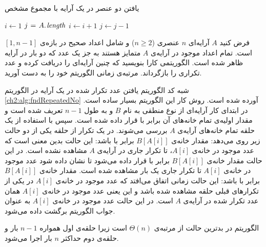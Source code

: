 \begin{algorithm}
\caption{یافتن دو عنصر در یک آرایه با مجموع مشخص}\label{ch2:alg:checkPair}
\begin{latin}
\begin{algorithmic}[1]
		\State	{}
		\State 	$i \gets 1$
		\State 	$j \mathrel{\hspace{1pt}=\hspace{1pt}} A.\hspace*{1pt}\mathit{length}$
					\State	\Return {}
					\State	$i \gets i+1$
				\Else
					\State	$j \gets j-1$
				\EndIf
		\EndWhile
		\State \Return {}\label{ch2:alg:ln:chkPairLast}
\EndFunction
\end{algorithmic}
\end{latin}
\end{algorithm}

 فرض کنید {$A$} آرایه‌ای {$n$} عنصری ({$n\geqslant 2$}) و شامل اعداد صحیح در بازه‌ی {$[1,n-1]$} است. تمام اعداد موجود در آرایه‌ی {$A$} متمایز هستند به جز یک عدد که دو بار در آرایه ظاهر شده است. الگوریتمی کارا بنویسید که چنین آرایه‌ای را دریافت کرده و عدد تکراری را بازگرداند. مرتبه‌ی زمانی الگوریتم خود را به دست آورید.


شبه کد الگوریتم یافتن عدد تکرار شده در یک آرایه در الگوریتم {\ref{ch2:alg:fndRepeatedNo}} آورده شده است. روش کار این الگوریتم بسیار ساده است. در ابتدای کار آرایه‌ای از نوع منطقی به نام {$B$} و به طول {$n-1$} تعریف شده است و مقدار اولیه‌ی تمام خانه‌های آن برابر با {} قرار داده شده است. سپس با استفاده از یک حلقه تمام خانه‌های آرایه‌ی {$A$} بررسی می‌شوند. در یک تکرار از حلقه یکی از دو حالت زیر روی می‌دهد:
 مقدار خانه‌ی {$B[A[i]]$} برابر با {} باشد: این حالت بدین معنی است که عدد موجود در خانه‌ی {$A[i]$}، تا تکرار جاری در آرایه‌ی {$A$} مشاهده نشده است. در این حالت مقدار خانه‌ی {$B[A[i]]$} برابر با {} قرار داده می‌شود تا نشان داده شود عدد موجود در خانه‌ی {$A[i]$} تا تکرار جاری یک بار مشاهده شده است.
 مقدار خانه‌ی {$B[A[i]]$} برابر با {} باشد: این حالت زمانی اتفاق می‌افتد که عدد موجود در خانه‌ی {$A[i]$} در یکی از تکرارهای قبلی حلقه مشاهده شده باشد و این یعنی عدد موجود در خانه‌ی {$A[i]$} همان عدد تکرار شده در آرایه‌ی {$A$} است. در این حالت عدد موجود در خانه‌ی {$A[i]$} به عنوان جواب الگوریتم برگشت داده می‌شود.

الگوریتم {} در بدترین حالت از مرتبه‌ی {$\Theta (n)$} است زیرا حلقه‌ی اول همواره {$n-1$} بار و حلقه‌ی دوم حداکثر {$n$} بار اجرا می‌شود.

